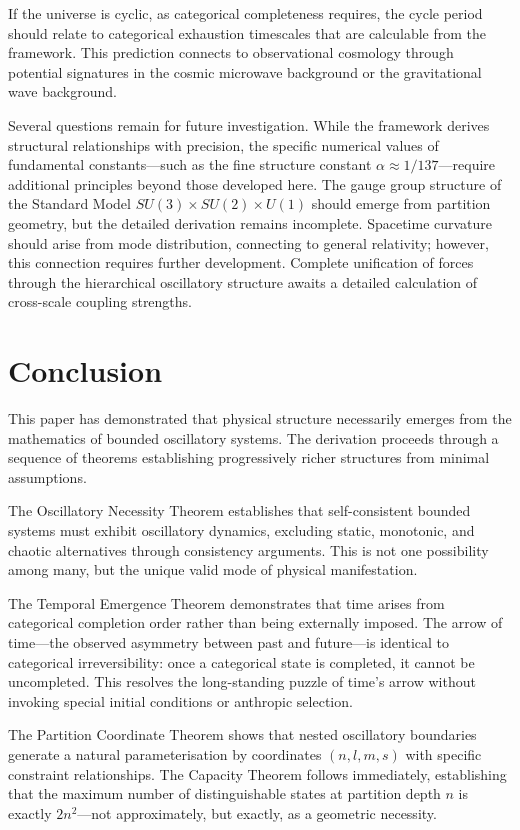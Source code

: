 \documentclass[11pt,a4paper]{article}
\theoremstyle{remark}
\begin{document}
If the universe is cyclic, as categorical completeness requires, the cycle period should relate to categorical exhaustion timescales that are calculable from the framework. This prediction connects to observational cosmology through potential signatures in the cosmic microwave background or the gravitational wave background.

Several questions remain for future investigation. While the framework derives structural relationships with precision, the specific numerical values of fundamental constants---such as the fine structure constant $\alpha \approx 1/137$---require additional principles beyond those developed here. The gauge group structure of the Standard Model $SU(3) \times SU(2) \times U(1)$ should emerge from partition geometry, but the detailed derivation remains incomplete. Spacetime curvature should arise from mode distribution, connecting to general relativity; however, this connection requires further development. Complete unification of forces through the hierarchical oscillatory structure awaits a detailed calculation of cross-scale coupling strengths.

\section{Conclusion}

This paper has demonstrated that physical structure necessarily emerges from the mathematics of bounded oscillatory systems. The derivation proceeds through a sequence of theorems establishing progressively richer structures from minimal assumptions.

The Oscillatory Necessity Theorem establishes that self-consistent bounded systems must exhibit oscillatory dynamics, excluding static, monotonic, and chaotic alternatives through consistency arguments. This is not one possibility among many, but the unique valid mode of physical manifestation.

The Temporal Emergence Theorem demonstrates that time arises from categorical completion order rather than being externally imposed. The arrow of time—the observed asymmetry between past and future—is identical to categorical irreversibility: once a categorical state is completed, it cannot be uncompleted. This resolves the long-standing puzzle of time's arrow without invoking special initial conditions or anthropic selection.

The Partition Coordinate Theorem shows that nested oscillatory boundaries generate a natural parameterisation by coordinates $(n, l, m, s)$ with specific constraint relationships. The Capacity Theorem follows immediately, establishing that the maximum number of distinguishable states at partition depth $n$ is exactly $2n^2$---not approximately, but exactly, as a geometric necessity.
\end{document}
